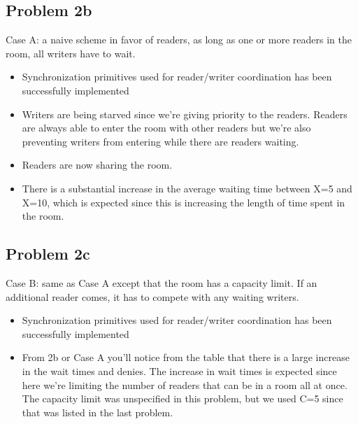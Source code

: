 \documentclass[12pt, a4paper, oneside]{article}
\begin{document}
\subsection*{Problem 2b}
Case A: a naive scheme in favor of readers, as long as one or more readers in the room, all writers have to wait.
\begin{itemize}
\item Synchronization primitives used for reader/writer coordination has been successfully implemented
\item Writers are being starved since we're giving priority to the readers. Readers are always able to enter the room with other readers but we're also preventing writers from entering while there are readers waiting. 
\item Readers are now sharing the room. 
\item There is a substantial increase in the average waiting time between X=5 and X=10, which is expected since this is increasing the length of time spent in the room. 
\end{itemize}

\subsection*{Problem 2c}
Case B: same as Case A except that the room has a capacity limit. If an additional reader comes, it has to compete with any waiting writers.
\begin{itemize}
\item Synchronization primitives used for reader/writer coordination has been successfully implemented
\item From 2b or Case A you'll notice from the table that there is a large increase in the wait times and denies. The increase in wait times is expected since here we're limiting the number of readers that can be in a room all at once. The capacity limit was unspecified in this problem, but we used C=5 since that was listed in the last problem.  
\end{itemize}
\end{document}
